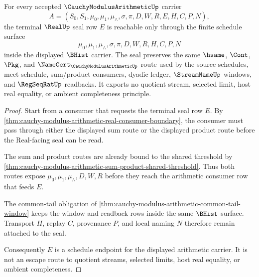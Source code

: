 \begin{theorem}
\label{thm:cauchy-modulus-arithmetic-real-seal-schedule-nonescape}
For every accepted $\CauchyModulusArithmeticUp$ carrier
$$
A=(S_0,S_1,\mu_0,\mu_1,\mu_{\wedge},\sigma,\pi,D,W,R,E,H,C,P,N),
$$
the terminal $\RealUp$ seal row $E$ is reachable only through the finite schedule
surface
$$
\mu_0,\mu_1,\mu_{\wedge},\sigma,\pi,D,W,R,H,C,P,N
$$
inside the displayed $\BHist$ carrier. The seal preserves the same $\hsame$,
$\Cont$, $\Pkg$, and $\NameCert_{\CauchyModulusArithmeticUp}$ route used by the
source schedules, meet schedule, sum/product consumers, dyadic ledger,
$\StreamNameUp$ windows, and $\RegSeqRatUp$ readbacks. It exports no quotient
stream, selected limit, host real equality, or ambient completeness principle.
\end{theorem}
\begin{proof}
Start from a consumer that requests the terminal seal row $E$. By
\autoref{thm:cauchy-modulus-arithmetic-real-consumer-boundary}, the consumer
must pass through either the displayed sum route or the displayed product route
before the Real-facing seal can be read.

The sum and product routes are already bound to the shared threshold by
\autoref{thm:cauchy-modulus-arithmetic-sum-product-shared-threshold}. Thus both
routes expose $\mu_0,\mu_1,\mu_{\wedge},D,W,R$ before they reach the arithmetic
consumer row that feeds $E$.

The common-tail obligation of
\autoref{thm:cauchy-modulus-arithmetic-common-tail-window} keeps the window and
readback rows inside the same $\BHist$ surface. Transport $H$, replay $C$,
provenance $P$, and local naming $N$ therefore remain attached to the seal.

Consequently $E$ is a schedule endpoint for the displayed arithmetic carrier.
It is not an escape route to quotient streams, selected limits, host real
equality, or ambient completeness.
\end{proof}

